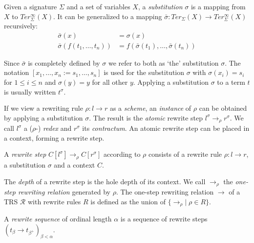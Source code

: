 \begin{definition}%
Given a signature $\Sigma$ and a set of variables $X$, a \emph{substitution}
$\sigma$ is a mapping from $X$ to $Ter_\Sigma^\infty(X)$. It can be
generalized to a mapping $\bar{\sigma} : Ter_\Sigma(X) \rightarrow
Ter_\Sigma^\infty(X)$ recursively:
\begin{align*}
  \bar{\sigma}(x) &= \sigma(x)\\
  \bar{\sigma}(f(t_1, \ldots, t_n)) &= f(\bar{\sigma}(t_1), \ldots,
  \bar{\sigma}(t_n))
\end{align*}
\end{definition}

Since $\bar{\sigma}$ is completely defined by $\sigma$ we refer to both as
`the' substitution $\sigma$. The notation $[x_1, \ldots, x_n := s_1, \ldots,
  s_n]$ is used for the substitution $\sigma$ with $\sigma(x_i) = s_i$ for $1
\leq i \leq n$ and $\sigma(y) = y$ for all other $y$. Applying a substitution
$\sigma$ to a term $t$ is usually written $t^\sigma$.

If we view a rewriting rule $\rho : l \rightarrow r$ as a \emph{scheme}, an
\emph{instance} of $\rho$ can be obtained by applying a substitution
$\sigma$. The result is the \emph{atomic} rewrite step $l^\sigma
\rightarrow_\rho r^\sigma$. We call $l^\sigma$ a ($\rho$-) \emph{redex} and
$r^\sigma$ its \emph{contractum}. An atomic rewrite step can be placed in a
context, forming a rewrite step.

\begin{definition}%
A \emph{rewrite step} $C[l^\sigma] \rightarrow_\rho C[r^\sigma]$ according to
$\rho$ consists of a rewrite rule $\rho : l \rightarrow r$, a substitution
$\sigma$ and a context $C$.
\end{definition}

The \emph{depth} of a rewrite step is the hole depth of its context.
We call $\rightarrow_\rho$ the \emph{one-step rewriting relation} generated by
$\rho$. The one-step rewriting relation $\rightarrow$ of a TRS $\mathcal{R}$
with rewrite rules $R$ is defined as the union of $\{ \rightarrow_\rho | \;
\rho \in R \}$.

\begin{definition}%
A \emph{rewrite sequence} of ordinal length $\alpha$ is a sequence of rewrite
steps $(t_\beta \rightarrow t_{\beta^+})_{\beta < \alpha}$.
\end{definition}

